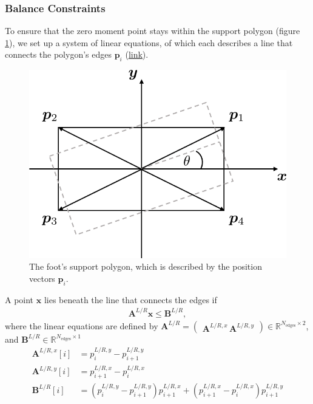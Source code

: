 \subsubsection{Balance Constraints} 
To ensure that the zero moment point stays within the support polygon (figure \ref{fig::212_foot_hull}), we set up a system of linear equations, of which each describes a line that connects the polygon's edges $\bm{p}_i$ (\href{https://github.com/mhubii/nmpc_pattern_generator/blob/5a213044c927dc6aac9f7e32ce1e5fb472cd67bb/libs/pattern_generator/src/base_generator.cpp#L844}{\underline{link}}). 
\begin{figure}[h!]
	\centering
	\includegraphics[scale=.5]{chapters/02_foundations_for_humanoid_walking/img/foot_convex_hull.png}
	\caption{The foot's support polygon, which is described by the position vectors $\bm{p}_i$.}
	\label{fig::212_foot_hull}
\end{figure}
A point $\bm{x}$ lies beneath the line that connects the edges if
\begin{align}
	\bm{A}^{L/R}\bm{x} \leq \bm{B}^{L/R},
	\label{eq::212_lin}
\end{align}
where the linear equations are defined by  $\bm{A}^{L/R}=\begin{pmatrix}
\bm{A}^{L/R,x}\,\bm{A}^{L/R,y}\end{pmatrix}\in\mathbb{R}^{N_{\text{edges}}\times2}$, and $\bm{B}^{L/R}\in\mathbb{R}^{N_{\text{edges}}\times1}$
\begin{align}
	\bm{A}^{L/R,x}[i] &= p^{L/R,y}_i-p^{L/R,y}_{i+1} \\
	\bm{A}^{L/R,y}[i] &= p^{L/R,x}_{i+1}-p^{L/R,x}_i \\
	\bm{B}^{L/R}[i] &= (p^{L/R,y}_i-p^{L/R,y}_{i+1})p^{L/R,x}_{i+1} + (p^{L/R,x}_{i+1}-p^{L/R,x}_i)p^{L/R,y}_{i+1}
\end{align}
